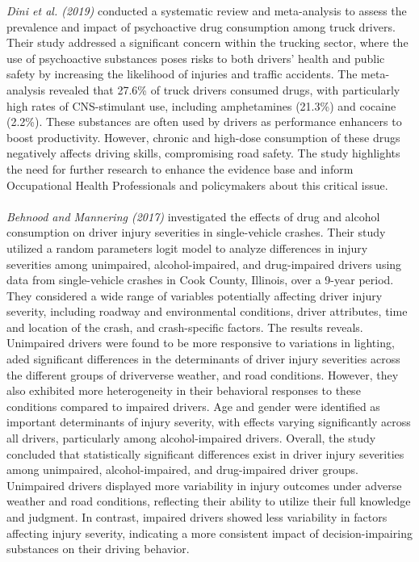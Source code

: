 \documentclass[12pt]{report}
\begin{document}
\textit{Dini et al. (2019)} conducted a systematic review and meta-analysis to assess the prevalence and impact of psychoactive drug consumption among truck drivers. Their study addressed a significant concern within the trucking sector, where the use of psychoactive substances poses risks to both drivers' health and public safety by increasing the likelihood of injuries and traffic accidents. The meta-analysis revealed that 27.6\% of truck drivers consumed drugs, with particularly high rates of CNS-stimulant use, including amphetamines (21.3\%) and cocaine (2.2\%). These substances are often used by drivers as performance enhancers to boost productivity. However, chronic and high-dose consumption of these drugs negatively affects driving skills, compromising road safety. The study highlights the need for further research to enhance the evidence base and inform Occupational Health Professionals and policymakers about this critical issue.\\\\
\textit{Behnood and Mannering (2017)} investigated the effects of drug and alcohol consumption on driver injury severities in single-vehicle crashes. Their study utilized a random parameters logit model to analyze differences in injury severities among unimpaired, alcohol-impaired, and drug-impaired drivers using data from single-vehicle crashes in Cook County, Illinois, over a 9-year period. They considered a wide range of variables potentially affecting driver injury severity, including roadway and environmental conditions, driver attributes, time and location of the crash, and crash-specific factors.
The results reveals. Unimpaired drivers were found to be more responsive to variations in lighting, aded significant differences in the determinants of driver injury severities across the different groups of driververse weather, and road conditions. However, they also exhibited more heterogeneity in their behavioral responses to these conditions compared to impaired drivers. Age and gender were identified as important determinants of injury severity, with effects varying significantly across all drivers, particularly among alcohol-impaired drivers.
Overall, the study concluded that statistically significant differences exist in driver injury severities among unimpaired, alcohol-impaired, and drug-impaired driver groups. Unimpaired drivers displayed more variability in injury outcomes under adverse weather and road conditions, reflecting their ability to utilize their full knowledge and judgment. In contrast, impaired drivers showed less variability in factors affecting injury severity, indicating a more consistent impact of decision-impairing substances on their driving behavior.\\\\
\end{document}
